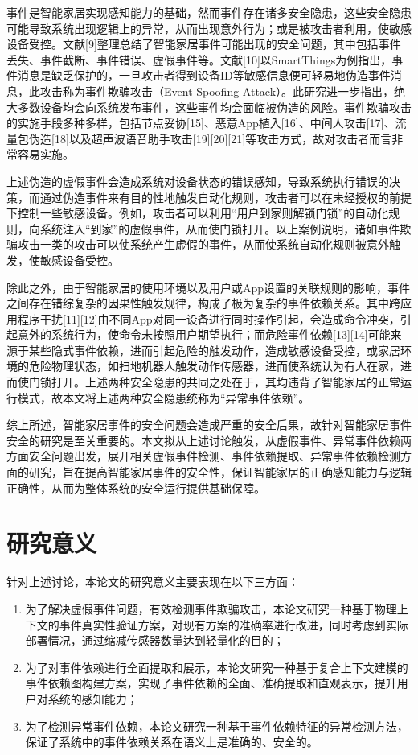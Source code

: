 事件是智能家居实现感知能力的基础，然而事件存在诸多安全隐患，这些安全隐患可能导致系统出现逻辑上的异常，从而出现意外行为；或是被攻击者利用，使敏感设备受控。文献[9]整理总结了智能家居事件可能出现的安全问题，其中包括事件丢失、事件截断、事件错误、虚假事件等。文献[10]以SmartThings为例指出，事件消息是缺乏保护的，一旦攻击者得到设备ID等敏感信息便可轻易地伪造事件消息，此攻击称为事件欺骗攻击（Event Spoofing Attack）。此研究进一步指出，绝大多数设备均会向系统发布事件，这些事件均会面临被伪造的风险。事件欺骗攻击的实施手段多种多样，包括节点妥协[15]、恶意App植入[16]、中间人攻击[17]、流量包伪造[18]以及超声波语音助手攻击[19][20][21]等攻击方式，故对攻击者而言非常容易实施。

上述伪造的虚假事件会造成系统对设备状态的错误感知，导致系统执行错误的决策，而通过伪造事件来有目的性地触发自动化规则，攻击者可以在未经授权的前提下控制一些敏感设备。例如，攻击者可以利用“用户到家则解锁门锁”的自动化规则，向系统注入“到家”的虚假事件，从而使门锁打开。以上案例说明，诸如事件欺骗攻击一类的攻击可以使系统产生虚假的事件，从而使系统自动化规则被意外触发，使敏感设备受控。

除此之外，由于智能家居的使用环境以及用户或App设置的关联规则的影响，事件之间存在错综复杂的因果性触发规律，构成了极为复杂的事件依赖关系。其中跨应用程序干扰[11][12]由不同App对同一设备进行同时操作引起，会造成命令冲突，引起意外的系统行为，使命令未按照用户期望执行；而危险事件依赖[13][14]可能来源于某些隐式事件依赖，进而引起危险的触发动作，造成敏感设备受控，或家居环境的危险物理状态，如扫地机器人触发动作传感器，进而使系统认为有人在家，进而使门锁打开。上述两种安全隐患的共同之处在于，其均违背了智能家居的正常运行模式，故本文将上述两种安全隐患统称为“异常事件依赖”。

综上所述，智能家居事件的安全问题会造成严重的安全后果，故针对智能家居事件安全的研究是至关重要的。本文拟从上述讨论触发，从虚假事件、异常事件依赖两方面安全问题出发，展开相关虚假事件检测、事件依赖提取、异常事件依赖检测方面的研究，旨在提高智能家居事件的安全性，保证智能家居的正确感知能力与逻辑正确性，从而为整体系统的安全运行提供基础保障。

\section{研究意义}

针对上述讨论，本论文的研究意义主要表现在以下三方面：

\begin{enumerate}
	\item 为了解决虚假事件问题，有效检测事件欺骗攻击，本论文研究一种基于物理上下文的事件真实性验证方案，对现有方案的准确率进行改进，同时考虑到实际部署情况，通过缩减传感器数量达到轻量化的目的；
	\item 为了对事件依赖进行全面提取和展示，本论文研究一种基于复合上下文建模的事件依赖图构建方案，实现了事件依赖的全面、准确提取和直观表示，提升用户对系统的感知能力；
	\item 为了检测异常事件依赖，本论文研究一种基于事件依赖特征的异常检测方法，保证了系统中的事件依赖关系在语义上是准确的、安全的。
\end{enumerate}

